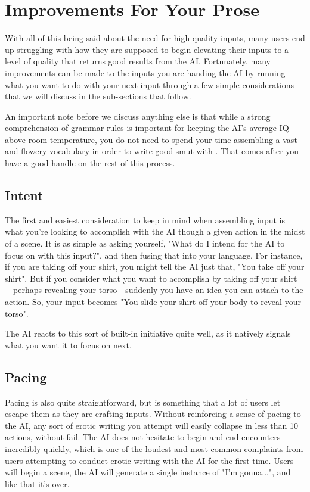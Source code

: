 ﻿\documentclass[Coomer-main.tex]{subfiles}
\begin{document}
\section{Improvements For Your Prose}

With all of this being said about the need for high-quality inputs, many users end up struggling with how they are supposed to begin elevating their inputs to a level of quality that returns good results from the AI.
Fortunately, many improvements can be made to the inputs you are handing the AI by running what you want to do with your next input through a few simple considerations that we will discuss in the sub-sections that follow.

An important note before we discuss anything else is that while a strong comprehension of grammar rules is important for keeping the AI's average IQ above room temperature, you do not need to spend your time assembling a vast and flowery vocabulary in order to write good smut with \aid.
That comes after you have a good handle on the rest of this process.

\subsection{Intent}

The first and easiest consideration to keep in mind when assembling input is what you're looking to accomplish with the AI though a given action in the midst of a scene.
It is as simple as asking yourself, "What do I intend for the AI to focus on with this input?", and then fusing that into your language.
For instance, if you are taking off your shirt, you might tell the AI just that, "You take off your shirt".
But if you consider what you want to accomplish by taking off your shirt—perhaps revealing your torso—suddenly you have an idea you can attach to the action.
So, your input becomes "You slide your shirt off your body to reveal your torso".

The AI reacts to this sort of built-in initiative quite well, as it natively signals what you want it to focus on next.

\subsection{Pacing}

Pacing is also quite straightforward, but is something that a lot of \aid users let escape them as they are crafting inputs.
Without reinforcing a sense of pacing to the AI, any sort of erotic writing you attempt will easily collapse in less than 10 actions, without fail.
The AI does not hesitate to begin and end encounters incredibly quickly, which is one of the loudest and most common complaints from users attempting to conduct erotic writing with the AI for the first time. Users will begin a scene, the AI will generate a single instance of "I'm gonna...", and like that it's over.
\end{document}
